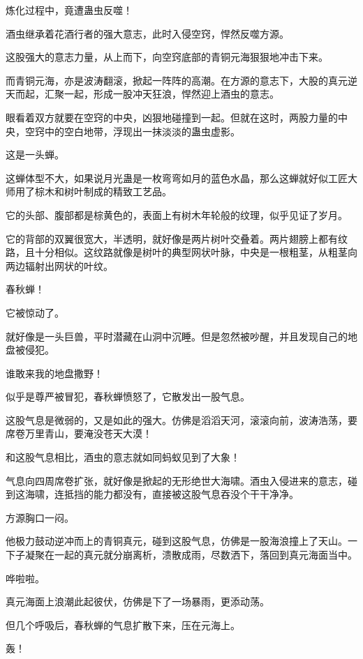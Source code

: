 
\begin{this_body}

炼化过程中，竟遭蛊虫反噬！

酒虫继承着花酒行者的强大意志，此时入侵空窍，悍然反噬方源。

这股强大的意志力量，从上而下，向空窍底部的青铜元海狠狠地冲击下来。

而青铜元海，亦是波涛翻滚，掀起一阵阵的高潮。在方源的意志下，大股的真元逆天而起，汇聚一起，形成一股冲天狂浪，悍然迎上酒虫的意志。

眼看着双方就要在空窍的中央，凶狠地碰撞到一起。但就在这时，两股力量的中央，空窍中的空白地带，浮现出一抹淡淡的蛊虫虚影。

这是一头蝉。

这蝉体型不大，如果说月光蛊是一枚弯弯如月的蓝色水晶，那么这蝉就好似工匠大师用了棕木和树叶制成的精致工艺品。

它的头部、腹部都是棕黄色的，表面上有树木年轮般的纹理，似乎见证了岁月。

它的背部的双翼很宽大，半透明，就好像是两片树叶交叠着。两片翅膀上都有纹路，且十分相似。这纹路就像是树叶的典型网状叶脉，中央是一根粗茎，从粗茎向两边辐射出网状的叶纹。

春秋蝉！

它被惊动了。

就好像是一头巨兽，平时潜藏在山洞中沉睡。但是忽然被吵醒，并且发现自己的地盘被侵犯。

谁敢来我的地盘撒野！

似乎是尊严被冒犯，春秋蝉愤怒了，它散发出一股气息。

这股气息是微弱的，又是如此的强大。仿佛是滔滔天河，滚滚向前，波涛浩荡，要席卷万里青山，要淹没苍天大漠！

和这股气息相比，酒虫的意志就如同蚂蚁见到了大象！

气息向四周席卷扩张，就好像是掀起的无形绝世大海啸。酒虫入侵进来的意志，碰到这海啸，连抵挡的能力都没有，直接被这股气息吞没个干干净净。

方源胸口一闷。

他极力鼓动逆冲而上的青铜真元，碰到这股气息，仿佛是一股海浪撞上了天山。一下子凝聚在一起的真元就分崩离析，溃散成雨，尽数洒下，落回到真元海面当中。

哗啦啦。

真元海面上浪潮此起彼伏，仿佛是下了一场暴雨，更添动荡。

但几个呼吸后，春秋蝉的气息扩散下来，压在元海上。

轰！


\end{this_body}
